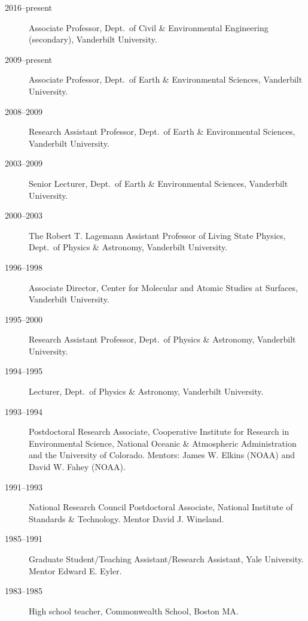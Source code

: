 \begin{description}
\item[2016--present] Associate Professor, Dept.\ of Civil \& Environmental Engineering (secondary), Vanderbilt University.
\item[2009--present] Associate Professor, Dept.\ of Earth \& Environmental Sciences, Vanderbilt University.
\item[2008--2009] Research Assistant Professor, Dept.\ of Earth \& Environmental Sciences, Vanderbilt University.
\item[2003--2009] Senior Lecturer, Dept.\ of Earth \& Environmental Sciences, Vanderbilt University.
\item[2000--2003] The Robert T. Lagemann Assistant Professor of Living State Physics, Dept.\ of Physics \& Astronomy, Vanderbilt University.
\item[1996--1998] Associate Director, Center for Molecular and Atomic Studies at Surfaces, Vanderbilt University.
\item[1995--2000] Research Assistant Professor, Dept.\ of Physics \& Astronomy, Vanderbilt University.
\item[1994--1995] Lecturer, Dept.\ of Physics \& Astronomy, Vanderbilt University.
\item[1993--1994] Postdoctoral Research Associate, Cooperative Institute for Research in Environmental Science, National Oceanic \& Atmospheric Administration and the University of Colorado. Mentors: James W. Elkins (NOAA) and David W. Fahey (NOAA).
\item[1991--1993] National Research Council Postdoctoral Associate, National Institute of Standards \& Technology. Mentor David J. Wineland.
\item[1985--1991] Graduate Student/Teaching Assistant/Research Assistant, Yale University. Mentor Edward E. Eyler.
\item[1983--1985] High school teacher, Commonwealth School, Boston MA.
\end{description}
